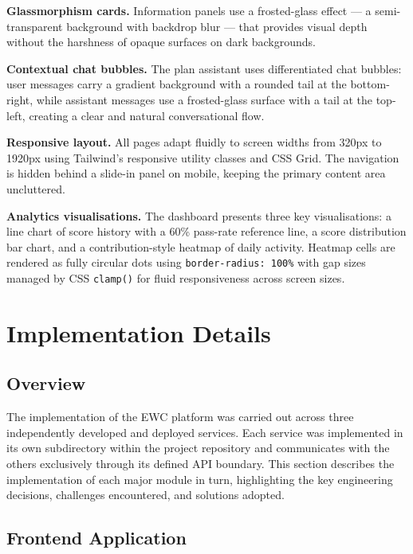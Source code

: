 \documentclass[12pt, a4paper]{report}
\begin{document}
\textbf{Glassmorphism cards.} Information panels use a frosted-glass effect — a semi-transparent background with backdrop blur — that provides visual depth without the harshness of opaque surfaces on dark backgrounds.

\textbf{Contextual chat bubbles.} The plan assistant uses differentiated chat bubbles: user messages carry a gradient background with a rounded tail at the bottom-right, while assistant messages use a frosted-glass surface with a tail at the top-left, creating a clear and natural conversational flow.

\textbf{Responsive layout.} All pages adapt fluidly to screen widths from 320px to 1920px using Tailwind's responsive utility classes and CSS Grid. The navigation is hidden behind a slide-in panel on mobile, keeping the primary content area uncluttered.

\textbf{Analytics visualisations.} The dashboard presents three key visualisations: a line chart of score history with a 60\% pass-rate reference line, a score distribution bar chart, and a contribution-style heatmap of daily activity. Heatmap cells are rendered as fully circular dots using \texttt{border-radius: 100\%} with gap sizes managed by CSS \texttt{clamp()} for fluid responsiveness across screen sizes.

\chapter{Implementation Details}
\label{ch:implementation}

\section{Overview}

The implementation of the EWC platform was carried out across three independently developed and deployed services. Each service was implemented in its own subdirectory within the project repository and communicates with the others exclusively through its defined API boundary. This section describes the implementation of each major module in turn, highlighting the key engineering decisions, challenges encountered, and solutions adopted.

\section{Frontend Application}
\end{document}
